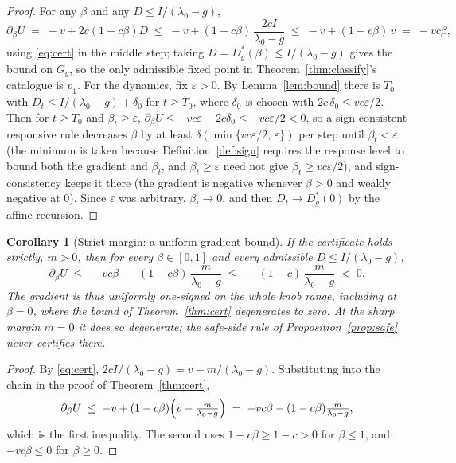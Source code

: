 \documentclass[11pt]{article}
\newtheorem{corollary}[theorem]{Corollary}
\theoremstyle{definition}
\theoremstyle{remark}
\numberwithin{equation}{section}
\begin{document}
\begin{proof}
For any $\beta$ and any $D\le I/(\lambda_0-g)$,
\[
\partial_\beta U \;=\; -v+2c(1-c\beta)D \;\le\; -v+(1-c\beta)\,\frac{2cI}{\lambda_0-g} \;\le\; -v+(1-c\beta)\,v \;=\; -vc\beta,
\]
using \eqref{eq:cert} in the middle step; taking $D=D^\ast_g(\beta)\le I/(\lambda_0-g)$ gives the bound on $G_g$, so the only admissible fixed point in Theorem~\ref{thm:classify}'s catalogue is $p_1$. For the dynamics, fix $\varepsilon>0$. By Lemma~\ref{lem:bound} there is $T_0$ with $D_t\le I/(\lambda_0-g)+\delta_0$ for $t\ge T_0$, where $\delta_0$ is chosen with $2c\,\delta_0\le vc\varepsilon/2$. Then for $t\ge T_0$ and $\beta_t\ge\varepsilon$, $\partial_\beta U\le -vc\varepsilon+2c\delta_0\le -vc\varepsilon/2<0$, so a sign-consistent responsive rule decreases $\beta$ by at least $\delta(\min\{vc\varepsilon/2,\,\varepsilon\})$ per step until $\beta_t<\varepsilon$ (the minimum is taken because Definition~\ref{def:sign} requires the response level to bound both the gradient and $\beta_t$, and $\beta_t\ge\varepsilon$ need not give $\beta_t\ge vc\varepsilon/2$), and sign-consistency keeps it there (the gradient is negative whenever $\beta>0$ and weakly negative at $0$). Since $\varepsilon$ was arbitrary, $\beta_t\to 0$, and then $D_t\to D^\ast_g(0)$ by the affine recursion.
\end{proof}

\begin{corollary}[Strict margin: a uniform gradient bound]\label{cor:strict}
If the certificate holds strictly, $m>0$, then for every $\beta\in[0,1]$ and every admissible $D\le I/(\lambda_0-g)$,
\[
\partial_\beta U
\;\le\; -vc\beta \;-\; (1-c\beta)\,\frac{m}{\lambda_0-g}
\;\le\; -\,(1-c)\,\frac{m}{\lambda_0-g}
\;<\;0 .
\]
The gradient is thus uniformly one-signed on the whole knob range, including at $\beta=0$, where the bound of Theorem~\ref{thm:cert} degenerates to zero. At the sharp margin $m=0$ it does so degenerate; the safe-side rule of Proposition~\ref{prop:safe} never certifies there.
\end{corollary}

\begin{proof}
By \eqref{eq:cert}, $2cI/(\lambda_0-g)=v-m/(\lambda_0-g)$. Substituting into the chain in the proof of Theorem~\ref{thm:cert},
\[
\partial_\beta U \;\le\; -v+(1-c\beta)\Bigl(v-\tfrac{m}{\lambda_0-g}\Bigr)
\;=\; -vc\beta-(1-c\beta)\tfrac{m}{\lambda_0-g},
\]
which is the first inequality. The second uses $1-c\beta\ge 1-c>0$ for $\beta\le1$, and $-vc\beta\le0$ for $\beta\ge0$.
\end{proof}
\end{document}
